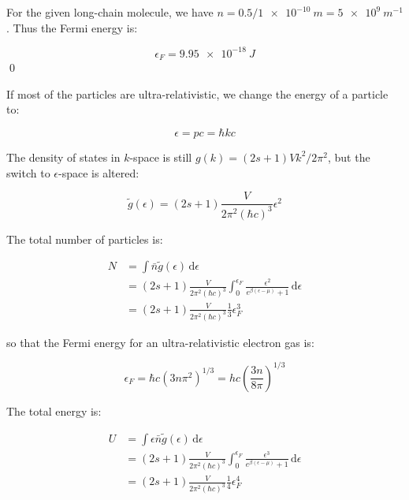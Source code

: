 \documentclass[12pt]{article}
\begin{document}
For the given long-chain molecule, we have $n = 0.5/\qty{1e-10}{m} = \qty{5e9}{m^{-1}}$. Thus the Fermi energy is:

\begin{equation}
    \epsilon_{F} = \qty{9.95e-18}{J}
\end{equation}
\qed



If most of the particles are ultra-relativistic, we change the energy of a particle to:

\begin{equation}
    \epsilon = pc = \hbar k c
\end{equation}

The density of states in $k$-space is still $g(k) = (2s + 1) V k^{2} / 2\pi^{2}$, but the switch to $\epsilon$-space is altered:

\begin{equation}
    \tilde{g}(\epsilon) = (2s + 1) \frac{V}{2\pi^{2}(\hbar c)^{3}} \epsilon^{2}
\end{equation}

The total number of particles is:

\begin{equation}
    \begin{split}
        N &= \int \bar{n} \tilde{g}(\epsilon) \, \mathrm{d}\epsilon \\
        &= (2s + 1) \frac{V}{2\pi^{2}(\hbar c)^{3}} \int_{0}^{\epsilon_{F}} \frac{\epsilon^{2}}{e^{\beta (\epsilon - \mu)} + 1} \, \mathrm{d}\epsilon \\
        &= (2s + 1) \frac{V}{2\pi^{2}(\hbar c)^{3}} \frac{1}{3} \epsilon_{F}^{3}
    \end{split}
\end{equation}

so that the Fermi energy for an ultra-relativistic electron gas is:

\begin{equation}
    \epsilon_{F} = \hbar c (3n \pi^{2})^{1/3} = hc \left( \frac{3n}{8\pi} \right)^{1/3}
\end{equation}

The total energy is:

\begin{equation}
    \begin{split}
        U &= \int \epsilon \bar{n} \tilde{g}(\epsilon) \, \mathrm{d}\epsilon \\
        &= (2s + 1) \frac{V}{2\pi^{2}(\hbar c)^{3}} \int_{0}^{\epsilon_{F}} \frac{\epsilon^{3}}{e^{\beta (\epsilon - \mu)} + 1} \, \mathrm{d}\epsilon \\
        &= (2s + 1) \frac{V}{2\pi^{2}(\hbar c)^{3}} \frac{1}{4} \epsilon_{F}^{4}
    \end{split}
\end{equation}
\end{document}
